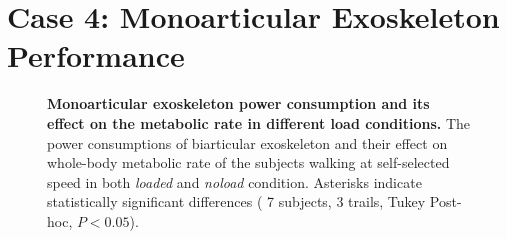 \documentclass[10pt,letterpaper]{article}
\begin{document}
\section*{Case 4: Monoarticular Exoskeleton Performance} 
\begin{figure}[ht!]
	\centering
	\hfil
	\vspace{1mm}
	\caption{\small{\textbf{Monoarticular exoskeleton power consumption and its effect on the metabolic rate in different load conditions.} The power consumptions of biarticular exoskeleton and their effect on whole-body metabolic rate of the subjects walking at self-selected speed in both {\it loaded} and {\it noload} condition. Asterisks indicate statistically significant differences ( 7 subjects, 3 trails, Tukey Post-hoc, $P < 0.05$).}}
	\label{Fig_Case04_Energy_Plot}
\end{figure}
\end{document}
